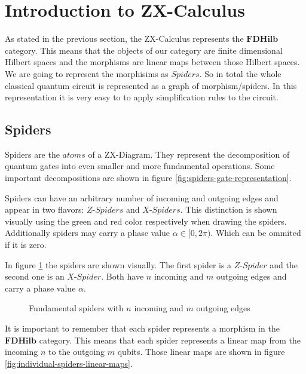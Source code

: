 \section{Introduction to ZX-Calculus}

As stated in the previous section, the ZX-Calculus represents the
$\mathbf{FDHilb}$ category. This means that the objects of our category are finite dimensional Hilbert spaces and the morphisms are linear maps between those Hilbert spaces. We are going to  represent the morphisims as $\textit{Spiders}$. So in total the whole classical quantum circuit is represented as a graph of morphism/spiders. In this representation it is very easy to to apply simplification rules to the circuit.

\subsection{Spiders}

Spiders are the $\textit{atoms}$ of a ZX-Diagram. They represent the decomposition of quantum gates into even smaller and more fundamental operations. Some important decompositions are shown in figure \ref{fig:spiders-gate-representation}.

Spiders can have an arbitrary number of incoming and outgoing edges and appear in two flavors: $\textit{Z-Spiders}$ and $\textit{X-Spiders}$. This distinction is shown visually using the green and red color respectively when drawing the spiders.
Additionally spiders may carry a phase value $\alpha \in [0, 2\pi)$. Which can be ommited if it is zero.

In figure \ref{fig:spiders-visual} the spiders are shown visually. The first spider is a $\textit{Z-Spider}$ and the second one is an $\textit{X-Spider}$. Both have $n$ incoming and $m$ outgoing edges and carry a phase value $\alpha$.

\begin{figure}[h]
    \centering
    \begin{ZX}
          \zxZ{\alpha} 
    \end{ZX}
    \begin{ZX}
          \zxX{\alpha} 
    \end{ZX}
    \caption{Fundamental spiders with $n$ incoming and $m$ outgoing edges}
    \label{fig:spiders-visual}
\end{figure}


It is important to remember that each spider represents a morphism in the $\mathbf{FDHilb}$ category. This means that each spider represents a linear map from the incoming $n$ to the outgoing $m$ qubits. Those linear maps are shown in figure \ref{fig:individual-spiders-linear-maps}.


